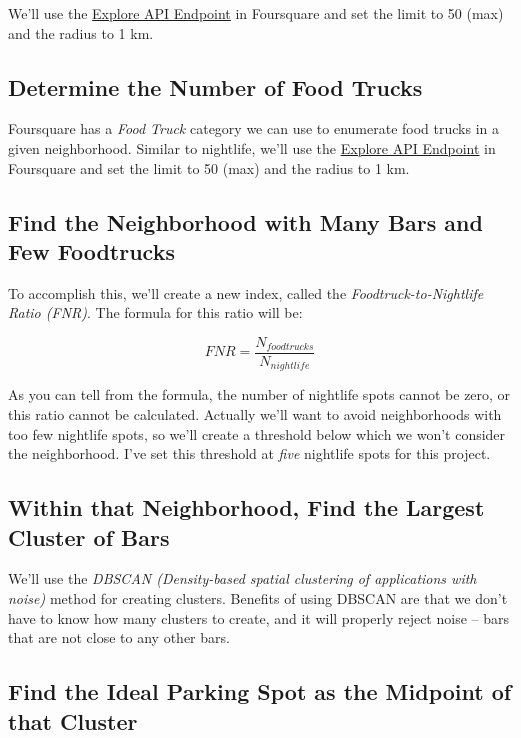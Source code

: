 \documentclass{deagle}
\begin{document}
We'll use the \href{https://developer.foursquare.com/docs/api-reference/venues/explore/}{Explore API Endpoint} in Foursquare and set the limit to 50 (max) and the radius to 1 km.

\subsection*{Determine the Number of Food Trucks}

Foursquare has a \emph{Food Truck} category we can use to enumerate food trucks in a given neighborhood. Similar to nightlife, we'll use the \href{https://developer.foursquare.com/docs/api-reference/venues/explore/}{Explore API Endpoint} in Foursquare and set the limit to 50 (max) and the radius to 1 km.

\subsection*{Find the Neighborhood with Many Bars and Few Foodtrucks}

To accomplish this, we'll create a new index, called the \emph{Foodtruck-to-Nightlife Ratio (FNR)}. The formula for this ratio will be:

\begin{equation}
	FNR = \frac{N_{foodtrucks}}{N_{nightlife}}
\end{equation}

As you can tell from the formula, the number of nightlife spots cannot be zero, or this ratio cannot be calculated. Actually we'll want to avoid neighborhoods with too few nightlife spots, so we'll create a threshold below which we won't consider the neighborhood. I've set this threshold at \emph{five} nightlife spots for this project.

\subsection*{Within that Neighborhood, Find the Largest Cluster of Bars}

We'll use the \emph{DBSCAN (Density-based spatial clustering of applications with noise)} method for creating clusters. Benefits of using DBSCAN are that we don't have to know how many clusters to create, and it will properly reject noise -- bars that are not close to any other bars.

\subsection*{Find the Ideal Parking Spot as the Midpoint of that Cluster}
\end{document}
